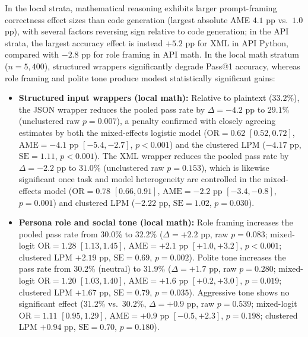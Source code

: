 \documentclass[a4paper,fleqn]{cas-sc}
\providecommand{\tightlist}{%
  \setlength{\itemsep}{0pt}\setlength{\parskip}{0pt}}
\begin{document}
In the local strata, mathematical reasoning exhibits larger prompt-framing correctness effect sizes than code generation (largest absolute AME $4.1$ pp vs.\ $1.0$ pp), with several factors reversing sign relative to code generation; in the API strata, the largest accuracy effect is instead $+5.2$ pp for XML in API Python, compared with $-2.8$ pp for role framing in API math. In the local math stratum ($n = 5,400$), structured wrappers significantly degrade Pass@1 accuracy, whereas role framing and polite tone produce modest statistically significant gains:
\begin{itemize}
\tightlist
\item \textbf{Structured input wrappers (local math):} Relative to plaintext ($33.2\%$), the JSON wrapper reduces the pooled pass rate by $\Delta = -4.2$ pp to $29.1\%$ (unclustered raw $p = 0.007$), a penalty confirmed with closely agreeing estimates by both the mixed-effects logistic model ($\text{OR} = 0.62$ $[0.52, 0.72]$, $\text{AME} = -4.1$ pp $[-5.4, -2.7]$, $p < 0.001$) and the clustered LPM ($-4.17$ pp, $\text{SE} = 1.11$, $p < 0.001$). The XML wrapper reduces the pooled pass rate by $\Delta = -2.2$ pp to $31.0\%$ (unclustered raw $p = 0.153$), which is likewise significant once task and model heterogeneity are controlled in the mixed-effects model ($\text{OR} = 0.78$ $[0.66, 0.91]$, $\text{AME} = -2.2$ pp $[-3.4, -0.8]$, $p = 0.001$) and clustered LPM ($-2.22$ pp, $\text{SE} = 1.02$, $p = 0.030$).
\item \textbf{Persona role and social tone (local math):} Role framing increases the pooled pass rate from $30.0\%$ to $32.2\%$ ($\Delta = +2.2$ pp, raw $p = 0.083$; mixed-logit $\text{OR} = 1.28$ $[1.13, 1.45]$, $\text{AME} = +2.1$ pp $[+1.0, +3.2]$, $p < 0.001$; clustered LPM $+2.19$ pp, $\text{SE} = 0.69$, $p = 0.002$). Polite tone increases the pass rate from $30.2\%$ (neutral) to $31.9\%$ ($\Delta = +1.7$ pp, raw $p = 0.280$; mixed-logit $\text{OR} = 1.20$ $[1.03, 1.40]$, $\text{AME} = +1.6$ pp $[+0.2, +3.0]$, $p = 0.019$; clustered LPM $+1.67$ pp, $\text{SE} = 0.79$, $p = 0.035$). Aggressive tone shows no significant effect ($31.2\%$ vs.\ $30.2\%$, $\Delta = +0.9$ pp, raw $p = 0.539$; mixed-logit $\text{OR} = 1.11$ $[0.95, 1.29]$, $\text{AME} = +0.9$ pp $[-0.5, +2.3]$, $p = 0.198$; clustered LPM $+0.94$ pp, $\text{SE} = 0.70$, $p = 0.180$).
\end{itemize}
\end{document}
